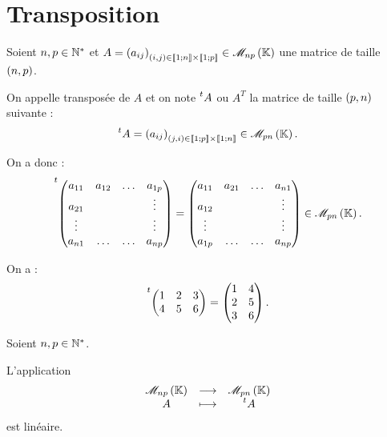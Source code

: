 \section{Transposition}

\begin{defi}
Soient \(n,p\in\mathbb{N}^*\) et \(A=\paren{a_{ij}}_{\paren{i,j}\in\interventierii{1}{n}\times\interventierii{1}{p}}\in\M{np}\) une matrice de taille \(\left(n,p\right)\).

On appelle transposée de \(A\) et on note \(\prescript{t}{}{A}\) ou \(A^T\) la matrice de taille \(\left(p,n\right)\) suivante : \[\trans{A}=\paren{a_{ij}}_{\paren{j,i}\in\interventierii{1}{p}\times\interventierii{1}{n}}\in\M{pn}.\]

On a donc : \[\trans{\begin{pmatrix}
a_{11} & a_{12} & \dots & a_{1p} \\
a_{21} &  &  & \vdots \\
\vdots &  &  & \vdots \\
a_{n1} & \dots & \dots & a_{np}
\end{pmatrix}}=\begin{pmatrix}
a_{11} & a_{21} & \dots & a_{n1} \\
a_{12} &  &  & \vdots \\
\vdots &  &  & \vdots \\
a_{1p} & \dots & \dots & a_{np}
\end{pmatrix}\in\M{pn}.\]
\end{defi}

\begin{ex}
On a : \[\prescript{t}{}{\begin{pmatrix}
1 & 2 & 3 \\
4 & 5 & 6
\end{pmatrix}}=\begin{pmatrix}
1 & 4 \\
2 & 5 \\
3 & 6
\end{pmatrix}.\]
\end{ex}

\begin{prop}
Soient \(n,p\in\mathbb{N}^*\).

L'application \[\fonctionlambda{\M{np}}{\M{pn}}{A}{\trans{A}}\] est linéaire.
\end{prop}

\begin{dem}
\end{dem}

